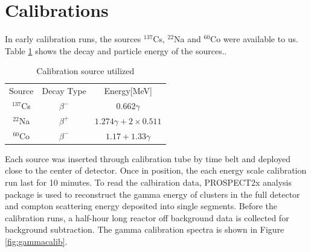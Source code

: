 \section{Calibrations}
In early calibration runs, the sources $^{137}$Cs, $^{22}$Na and $^{60}$Co were available to us.
Table \ref{tab:src_table} shows the decay and particle energy of the sources..
\begin{table}
    \centering
    \begin{tabular}{c|c|c}
        Source & Decay Type & Energy[MeV]\\
        $^{137}$Cs  & $\beta^-$   & $0.662 \gamma$\\
        $^{22}$Na   & $\beta^+$   & $1.274 \gamma + 2\times0.511$ \\
        $^{60}$Co   & $\beta^-$   & $1.17 + 1.33 \gamma$
    \end{tabular}
    \caption{Calibration source utilized}
    \label{tab:src_table}
\end{table}

Each source was inserted through calibration tube by time belt and deployed close to the center of detector.
Once in position, the each energy scale calibration run last for 10 minutes.
To read the calbiration data, PROSPECT2x analysis package \cite{P2X} is used to reconstruct the gamma energy of clusters in the full detector and compton scattering energy deposited into single segments. 
Before the calibration runs, a half-hour long reactor off background data is collected for background subtraction. 
The gamma calibration spectra is shown in Figure \ref{fig:gammacalib}.

